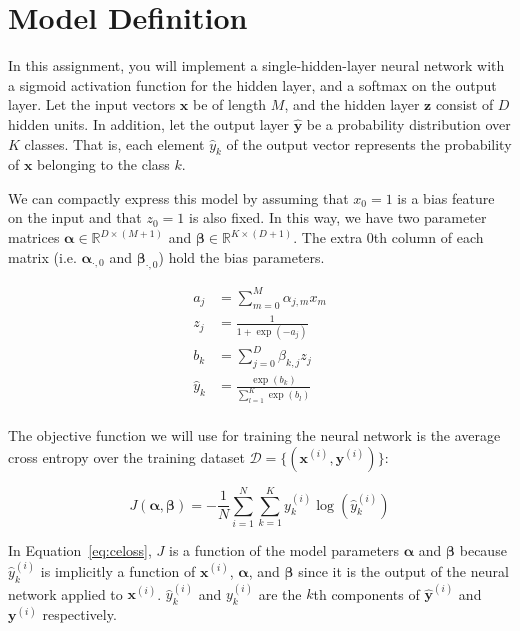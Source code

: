 \documentclass[11pt,addpoints,answers]{exam}
\newcommand{\Dc}{\mathcal{D}}
\newcommand{\Rb}{\mathbb{R}}
\newcommand{\wv}{\mathbf{w}}
\newcommand{\xv}{\mathbf{x}}
\newcommand{\yv}{\mathbf{y}}
\newcommand{\zv}{\mathbf{z}}
\newcommand{\alphav     }{\boldsymbol \alpha     }
\newcommand{\betav      }{\boldsymbol \beta      }
\begin{document}
\section{Model Definition}
\label{sec:model}

In this assignment, you will implement a single-hidden-layer neural network with a sigmoid activation function for the hidden layer, and a softmax on the output layer. Let the input vectors $\xv$ be of length $M$, and the hidden layer $\zv$ consist of $D$ hidden units. In addition, let the output layer $\hat{\yv}$ be a probability distribution over $K$ classes. That is, each element $\hat{y}_k$ of the output vector represents the probability of $\xv$ belonging to the class $k$.


We can compactly express this model by assuming that $x_0=1$ is a bias feature on the input and that $z_0=1$ is also fixed. In this way, we have two parameter matrices $\alphav \in \Rb^{D \times (M+1)}$ and $\betav \in \Rb^{K \times (D+1)}$. The extra $0$th column of each matrix (i.e. $\alphav_{\cdot, 0}$ and $\betav_{\cdot, 0}$) hold the bias parameters.

\begin{align*}
a_j &= \sum_{m=0}^M \alpha_{j,m} x_m
\\
z_j &= \frac{1}{1+\exp(-a_j)}
\\
b_k &= \sum_{j=0}^D \beta_{k,j} z_j
\\
\hat{y}_k &= \frac{\exp(b_k)}{\sum_{l=1}^K \exp(b_l)}
\\
\end{align*}

The objective function we will use for training the neural network is the average cross entropy over the training dataset $\Dc = \{ (\xv^{(i)}, \yv^{(i)}) \}$:

\begin{equation}
\label{eq:celoss}
J(\alphav, \betav)= - \frac{1}{N} \sum_{i=1}^N \sum_{k=1}^{K} y_k^{(i)} \log (\hat{y}^{(i)}_k)
\end{equation}

In Equation~\ref{eq:celoss}, $J$ is a function of the model parameters $\alphav$ and $\betav$ because $\hat{y}^{(i)}_k$ is implicitly a function of $\xv^{(i)}$, $\alphav$, and $\betav$ since it is the output of the neural network applied to $\xv^{(i)}$. $\hat{y}^{(i)}_k$ and $y_k^{(i)}$ are the $k$th components of $\hat{\yv}^{(i)}$ and $\yv^{(i)}$ respectively.
\end{document}
